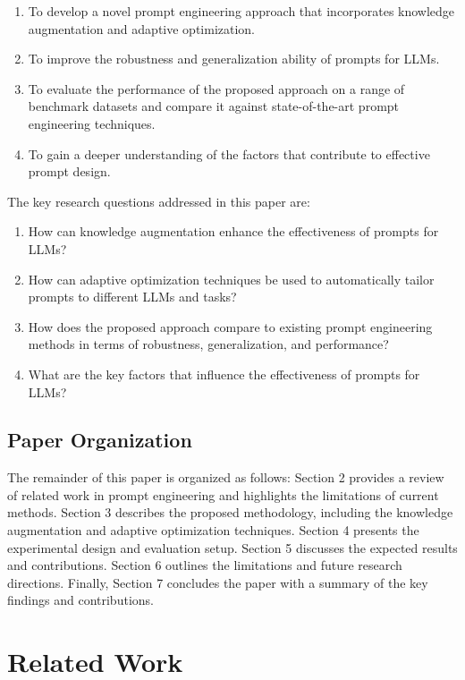 \documentclass{article}
\begin{document}
\begin{enumerate}
    \item To develop a novel prompt engineering approach that incorporates knowledge augmentation and adaptive optimization.
    \item To improve the robustness and generalization ability of prompts for LLMs.
    \item To evaluate the performance of the proposed approach on a range of benchmark datasets and compare it against state-of-the-art prompt engineering techniques.
    \item To gain a deeper understanding of the factors that contribute to effective prompt design.
\end{enumerate}

The key research questions addressed in this paper are:

\begin{enumerate}
    \item How can knowledge augmentation enhance the effectiveness of prompts for LLMs?
    \item How can adaptive optimization techniques be used to automatically tailor prompts to different LLMs and tasks?
    \item How does the proposed approach compare to existing prompt engineering methods in terms of robustness, generalization, and performance?
    \item What are the key factors that influence the effectiveness of prompts for LLMs?
\end{enumerate}

\subsection{Paper Organization}

The remainder of this paper is organized as follows: Section 2 provides a review of related work in prompt engineering and highlights the limitations of current methods. Section 3 describes the proposed methodology, including the knowledge augmentation and adaptive optimization techniques. Section 4 presents the experimental design and evaluation setup. Section 5 discusses the expected results and contributions. Section 6 outlines the limitations and future research directions. Finally, Section 7 concludes the paper with a summary of the key findings and contributions.

\section{Related Work}
\end{document}
